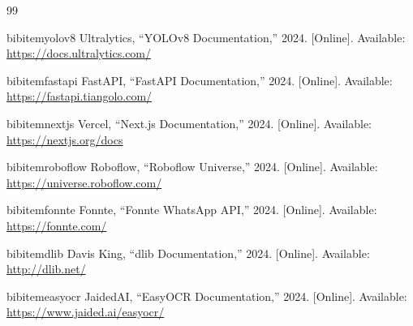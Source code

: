 \documentclass[12pt,a4paper,oneside]{book}
\begin{document}
\begin{thebibliography}{99}


bibitem{yolov8}
Ultralytics, ``YOLOv8 Documentation,'' 2024. [Online]. Available: \url{https://docs.ultralytics.com/}

bibitem{fastapi}
FastAPI, ``FastAPI Documentation,'' 2024. [Online]. Available: \url{https://fastapi.tiangolo.com/}

bibitem{nextjs}
Vercel, ``Next.js Documentation,'' 2024. [Online]. Available: \url{https://nextjs.org/docs}

bibitem{roboflow}
Roboflow, ``Roboflow Universe,'' 2024. [Online]. Available: \url{https://universe.roboflow.com/}

bibitem{fonnte}
Fonnte, ``Fonnte WhatsApp API,'' 2024. [Online]. Available: \url{https://fonnte.com/}

bibitem{dlib}
Davis King, ``dlib Documentation,'' 2024. [Online]. Available: \url{http://dlib.net/}

bibitem{easyocr}
JaidedAI, ``EasyOCR Documentation,'' 2024. [Online]. Available: \url{https://www.jaided.ai/easyocr/}

\end{thebibliography}

\printindex
\end{document}
